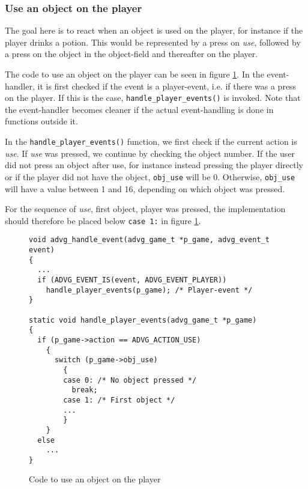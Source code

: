 \documentclass[a4wide]{article}
\begin{document}
\subsubsection{Use an object on the player}
The goal here is to react when an object is used on the player, for instance if
the player drinks a potion. This would be represented by a press on \emph{use},
followed by a press on the object in the object-field and thereafter on the
player.

The code to use an object on the player can be seen in figure
\ref{fig:obj_on_player}. In the event-handler, it is first checked if the event
is a player-event, i.e.  if there was a press on the player. If this is the
case, \verb&handle_player_events()& is invoked. Note that the event-handler
becomes cleaner if the actual event-handling is done in functions outside it.

In the \verb&handle_player_events()& function, we first check if the current
action is \emph{use}. If \emph{use} was pressed, we continue by checking the
object number. If the user did not press an object after use, for instance
instead pressing the player directly or if the player did not have the object,
\verb&obj_use& will be 0. Otherwise, \verb&obj_use& will have a value between 1
and 16, depending on which object was pressed.

For the sequence of \emph{use}, first object, player was pressed, the
implementation should therefore be placed below \verb&case 1:& in figure
\ref{fig:obj_on_player}.

\begin{figure}
  \scriptsize
\begin{verbatim}
void advg_handle_event(advg_game_t *p_game, advg_event_t event)
{
  ...
  if (ADVG_EVENT_IS(event, ADVG_EVENT_PLAYER))
    handle_player_events(p_game); /* Player-event */
}

static void handle_player_events(advg_game_t *p_game)
{
  if (p_game->action == ADVG_ACTION_USE)
    {
      switch (p_game->obj_use)
        {
        case 0: /* No object pressed */
          break;
        case 1: /* First object */
        ...
        }
    }
  else
    ...
}
\end{verbatim}
  \normalsize
  \label{fig:obj_on_player}
  \caption{Code to use an object on the player}
\end{figure}
\end{document}
